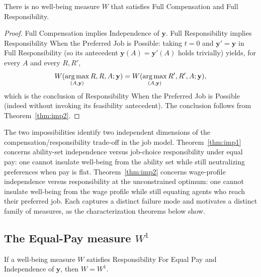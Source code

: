 \begin{corollary}
\label{cor:imp}
There is no well-being measure $W$ that satisfies Full Compensation and Full
Responsibility.
\end{corollary}

\begin{proof}
Full Compensation implies Independence of $\mathbf y$. Full Responsibility
implies Responsibility When the Preferred Job is Possible: taking $t=0$ and
$\mathbf y'=\mathbf y$ in Full Responsibility (so its antecedent
$\mathbf y(A)=\mathbf y'(A)$ holds trivially) yields, for every $A$ and every
$R,R'$,
\begin{equation*}
W(\operatorname*{arg\,max}_{(A,\mathbf y)}R,R,A;\mathbf y)
=W(\operatorname*{arg\,max}_{(A,\mathbf y)}R',R',A;\mathbf y),
\end{equation*}
which is the conclusion of Responsibility When the Preferred Job is Possible
(indeed without invoking its feasibility antecedent). The conclusion follows
from Theorem~\ref{thm:imp2}.
\end{proof}

The two impossibilities identify two independent dimensions of the
compensation/responsibility trade-off in the job model.
Theorem~\ref{thm:imp1} concerns ability-set independence versus job-choice
responsibility under equal pay: one cannot insulate well-being from the ability
set while still neutralizing preferences when pay is flat.
Theorem~\ref{thm:imp2} concerns wage-profile independence versus responsibility
at the unconstrained optimum: one cannot insulate well-being from the wage
profile while still equating agents who reach their preferred job. Each
captures a distinct failure mode and motivates a distinct family of measures,
as the characterization theorems below show.


\subsection{The Equal-Pay measure $W^1$}

\begin{theorem}
\label{thm:w1}
If a well-being measure $W$ satisfies Responsibility For Equal Pay and
Independence of $\mathbf y$, then $W=W^1$.
\end{theorem}

